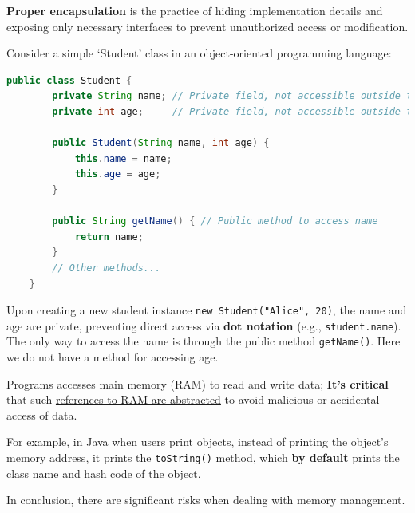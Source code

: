 \begin{Def}

    \label{def:proper_encapsulation}

    \textbf{Proper encapsulation} is the practice of hiding implementation details and exposing only necessary interfaces to prevent unauthorized access or modification.
\end{Def}
\begin{Example}

    \label{ex:student_class}

    Consider a simple `Student' class in an object-oriented programming language:

    \begin{lstlisting}[language=Java, numbers=none]
    public class Student {
        private String name; // Private field, not accessible outside the class
        private int age;     // Private field, not accessible outside the class

        public Student(String name, int age) {
            this.name = name;
            this.age = age;
        }

        public String getName() { // Public method to access name
            return name;
        }
        // Other methods...
    }
    \end{lstlisting}
    Upon creating a new student instance \texttt{new Student("Alice", 20)}, the name and age are private, preventing direct access via \textbf{dot notation} (e.g., \texttt{student.name}).
    The only way to access the name is through the public method \texttt{getName()}. Here we do not have a method for accessing age.
\end{Example}

\begin{Def}

    \label{def:accessing_main_memory}

    Programs accesses main memory (RAM) to read and write data; \textbf{It's critical} that 
    such \underline{references to RAM are abstracted} to avoid malicious or accidental access of data.

    For example, in Java when users print objects, instead of 
    printing the object's memory address, it prints the \texttt{toString()} method, which \textbf{by default} prints the class name and hash code of the object.
\end{Def}
\noindent
In conclusion, there are significant risks when dealing with memory management.